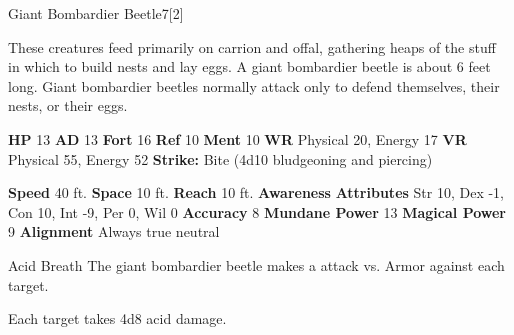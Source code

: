   \begin{monsection}{Giant Bombardier Beetle}{7}[2]
    \vspace{-1em}\vspace{-1em}
    \vspace{0em}

    
      These creatures feed primarily on carrion and offal, gathering heaps of the stuff in which to build nests and lay eggs.
      A giant bombardier beetle is about 6 feet long. Giant bombardier beetles normally attack only to defend themselves, their nests, or their eggs.
    
    

    \begin{spellcontent}
      \begin{spelltargetinginfo}
        \pari \textbf{HP} 13 \monsep
          \textbf{AD} 13 \monsep
          \textbf{Fort} 16 \monsep
          \textbf{Ref} 10 \monsep
          \textbf{Ment} 10
        \pari \textbf{WR} Physical 20, Energy 17 \monsep
        \textbf{VR} Physical 55, Energy 52
        \pari \textbf{Strike:}
            Bite  (4d10 bludgeoning and piercing)
      \end{spelltargetinginfo}
    \end{spellcontent}
    \begin{monsterfooter}
      \pari \textbf{Speed} 40 ft. \monsep
        \textbf{Space} 10 ft. \monsep
        \textbf{Reach} 10 ft.
      \pari \textbf{Awareness} 
      \pari \textbf{Attributes}
        Str 10, Dex -1,
        Con 10, Int -9,
        Per 0, Wil 0
      \pari \textbf{Accuracy} 8 \monsep
        \textbf{Mundane Power} 13 \monsep
      \textbf{Magical Power} 9
      \pari \textbf{Alignment} Always true neutral
    \end{monsterfooter}
  \end{monsection}
  \begin{freeability}{Acid Breath}
       The giant bombardier beetle makes a  attack
        vs. Armor against each target.
    
    \hit Each target takes 4d8 acid damage.
    \end{freeability}
  
